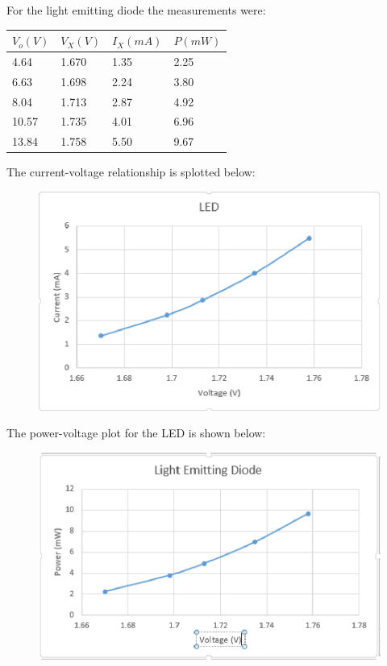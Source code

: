 \documentclass[twocolumn, amsmath]{revtex4}
\begin{document}
\newpage

For the light emitting diode the measurements were:

\begin{center}
    \begin{tabular}{| l | l | l | l|}
    \hline
    $V_{o} (V)$ & $V_{X} (V)$  & $I_{X} (mA)$ & $P (mW)$ \\ \hline
    
    4.64	& 1.670  	& 1.35		& 2.25 	 \\ \hline
    6.63	& 1.698  	& 2.24 	 	& 3.80	\\ \hline
    8.04	& 1.713  	& 2.87	 	& 4.92	\\ \hline
    10.57    	& 1.735  	& 4.01  	& 6.96	 \\ \hline
    13.84   	& 1.758    	& 5.50  	& 9.67	 	\\ 
    \hline
    \end{tabular}
\end{center}

The current-voltage relationship is splotted below:
	
\begin{figure}[h]  
\includegraphics[scale = 0.4]{LED.eps}  
\end{figure}

The power-voltage plot for the LED is shown below:

\begin{figure}[h]  

\includegraphics[scale = 0.4]{powerled.eps}  
\end{figure}
\end{document}
